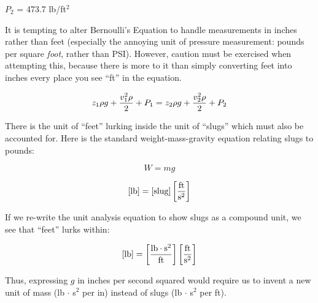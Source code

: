 $P_2$ = 473.7 lb/ft$^{2}$

\vskip 10pt

It is tempting to alter Bernoulli's Equation to handle measurements in inches rather than feet (especially the annoying unit of pressure measurement: pounds per square {\it foot}, rather than PSI).  However, caution must be exercised when attempting this, because there is more to it than simply converting feet into inches every place you see ``ft'' in the equation.

$$z_1 \rho g + {v_1^2 \rho \over 2} + P_1 = z_2 \rho g + {v_2^2 \rho \over 2} + P_2$$

There is the unit of ``feet'' lurking inside the unit of ``slugs'' which must also be accounted for.  Here is the standard weight-mass-gravity equation relating slugs to pounds:

$$W = mg$$

$$[\hbox{lb}] = [\hbox{slug}] \left[ \hbox{ft} \over \hbox{s}^2 \right]$$

If we re-write the unit analysis equation to show slugs as a compound unit, we see that ``feet'' lurks within:

$$[\hbox{lb}] = \left[{\hbox{lb} \cdot \hbox{s}^2} \over \hbox{ft}\right] \left[ \hbox{ft} \over \hbox{s}^2 \right]$$

Thus, expressing $g$ in inches per second squared would require us to invent a new unit of mass (lb $\cdot$ s$^{2}$ per in) instead of slugs (lb $\cdot$ s$^{2}$ per ft).











